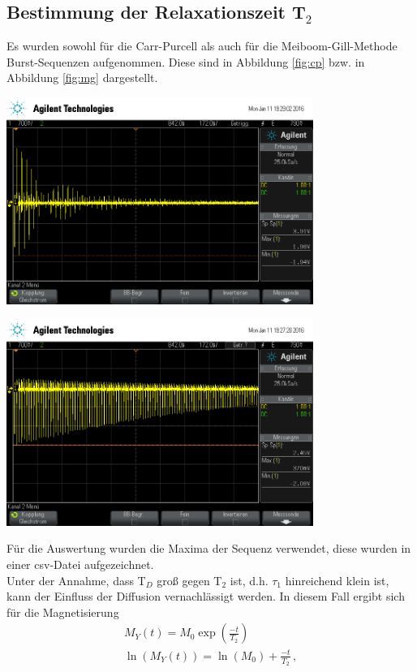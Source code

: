 \documentclass[]{scrartcl}
\begin{document}
\subsection{Bestimmung der Relaxationszeit T$_2$}
Es wurden sowohl für die Carr-Purcell als auch für die Meiboom-Gill-Methode Burst-Sequenzen aufgenommen. Diese sind in Abbildung \ref{fig:cp} bzw. in Abbildung \ref{fig:mg} dargestellt.
\begin{center}
	\includegraphics[width=10cm]{images/carrpur.png}
	\label{fig:cp}
\end{center}
\begin{center}
	\includegraphics[width=10cm]{images/meigill.png}
	\label{fig:mg}
\end{center}
Für die Auswertung wurden die Maxima der Sequenz verwendet, diese wurden in einer csv-Datei aufgezeichnet. \\
Unter der Annahme, dass T$_D$ groß gegen T$_2$ ist, d.h. $\tau_1$ hinreichend klein ist, kann der Einfluss der Diffusion vernachlässigt werden. In diesem Fall ergibt sich für die Magnetisierung 
\begin{align}
M_Y(t)=M_0\exp\left( \frac{-t}{T_2}\right) \\
\ln(M_Y(t))=\ln(M_0) + \frac{-t}{T_2}\,  ,
\end{align}
\end{document}
